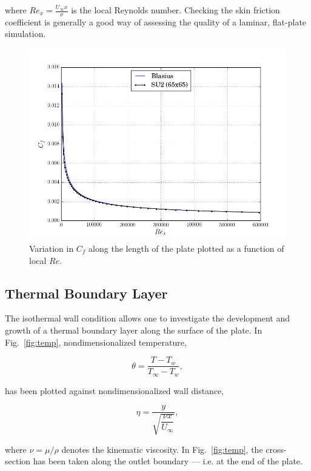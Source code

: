 \documentclass[12pt,letterpaper]{article}
\begin{document}
where $Re_x = \tfrac{U_\infty x}{\nu}$ is the local Reynolds number. Checking the skin friction coefficient is generally a good way of assessing the quality of a laminar, flat-plate simulation.

\begin{figure}[h] 
\centering
\includegraphics[width=\linewidth]{cf_350.png}
\caption{Variation in $C_f$ along the length of the plate plotted as a function of local $Re$.}
\label{fig:cf}
\end{figure}

\subsection*{Thermal Boundary Layer}
The isothermal wall condition allows one to investigate the development and growth of a thermal boundary layer along the surface of the plate. In Fig.~\ref{fig:temp}, nondimensionalized temperature, 

\begin{equation*}
\theta = \dfrac{T-T_w}{T_\infty-T_w},
\end{equation*}

has been plotted against nondimensionalized wall distance,

\begin{equation*}
\eta = \dfrac{y}{\sqrt{\dfrac{\nu x}{U_\infty}}},
\end{equation*}

where $\nu = \mu/\rho$ denotes the kinematic viscosity. In Fig.~\ref{fig:temp}, the cross-section has been taken along the outlet boundary --- i.e. at the end of the plate.
\end{document}
